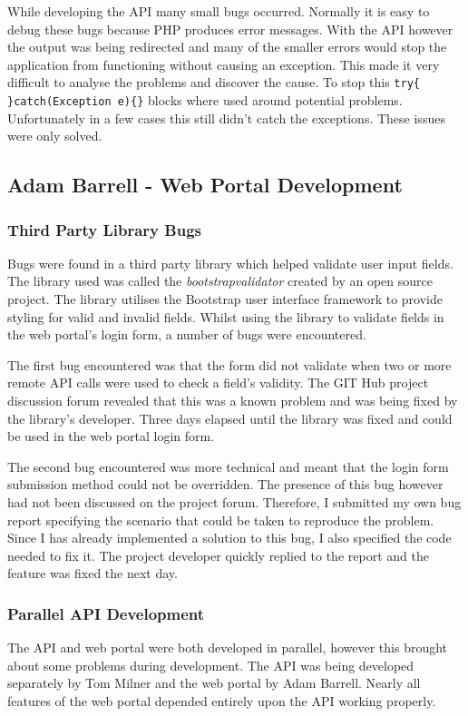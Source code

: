 \documentclass[11pt,a4paper]{report}
\begin{document}
While developing the API many small bugs occurred. Normally it is easy to debug these bugs because PHP produces error messages. With the API however the output was being redirected and many of the smaller errors would stop the application from functioning without causing an exception.  This made it very difficult to analyse the problems and discover the cause. To stop this \lstinline$try{ }catch(Exception e){}$ blocks where used around potential problems. Unfortunately in a few cases this still didn't catch the exceptions. These issues were only solved. 

\subsection{Adam Barrell - Web Portal Development}

\subsubsection{Third Party Library Bugs}
Bugs were found in a third party library which helped validate user input fields. The library used was called the \emph{bootstrapvalidator}\cite{bootstrapvalidator} created by an open source project. The library utilises the Bootstrap user interface framework to provide styling for valid and invalid fields. Whilst using the library to validate fields in the web portal's login form, a number of bugs were encountered.

The first bug encountered was that the form did not validate when two or more remote API calls were used to check a field's validity. The GIT Hub project discussion forum revealed that this was a known problem and was being fixed by the library's developer. Three days elapsed until the library was fixed and could be used in the web portal login form.

The second bug encountered was more technical and meant that the login form submission method could not be overridden. The presence of this bug however had not been discussed on the project forum. Therefore, I submitted my own bug report specifying the scenario that could be taken to reproduce the problem. Since I has already implemented a solution to this bug, I also specified the code needed to fix it. The project developer quickly replied to the report and the feature was fixed the next day.

\subsubsection{Parallel API Development}
The API and web portal were both developed in parallel, however this brought about some problems during development. The API was being developed separately by Tom Milner and the web portal by Adam Barrell. Nearly all features of the web portal depended entirely upon the API working properly.
\end{document}
